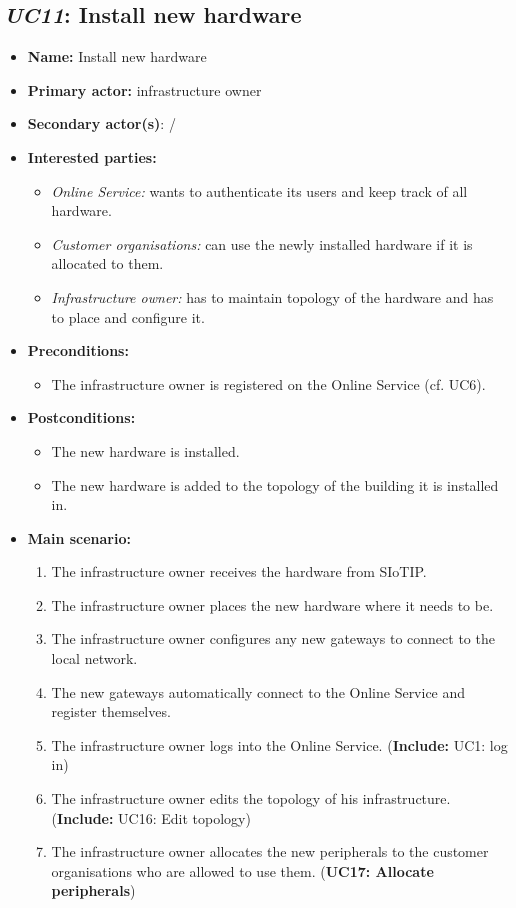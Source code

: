 \documentclass[english]{sareport}
\begin{document}
\subsection{\emph{UC11}: Install new hardware}
\begin{itemize}
    \item \textbf{Name:} Install new hardware
    \item \textbf{Primary actor:} infrastructure owner
    \item \textbf{Secondary actor(s)}: /
    \item \textbf{Interested parties:} 
        \begin{itemize}
            \item \textit{Online Service:}  wants to authenticate its users and keep track of all hardware.
            \item \textit{Customer organisations:} can use the newly installed hardware if it is allocated to them.
            \item \textit{Infrastructure owner:} has to maintain topology of the hardware and has to place and configure it.
        \end{itemize}

    \item \textbf{Preconditions:}
        \begin{itemize}
            \item The infrastructure owner is registered on the Online Service (cf. UC6).
        \end{itemize}

    \item \textbf{Postconditions:}
        \begin{itemize}
            \item The new hardware is installed.
            \item The new hardware is added to the topology of the building it is installed in.
        \end{itemize}
        
    \item \textbf{Main scenario:} 
    \begin{enumerate}
       \item The infrastructure owner receives the hardware from SIoTIP.
       \item The infrastructure owner places the new hardware where it needs to be.
       \item The infrastructure owner configures any new gateways to connect to the local network.
       \item The new gateways automatically connect to the Online Service and register themselves.
       \item The infrastructure owner logs into the Online Service. (\textbf{Include:} UC1: log in)
       \item The infrastructure owner edits the topology of his infrastructure. (\textbf{Include:} UC16: Edit topology)
       \item The infrastructure owner allocates the new peripherals to the customer organisations who are allowed to use them. (\textbf{UC17: Allocate peripherals})
    \end{enumerate}
\end{itemize}
\end{document}
